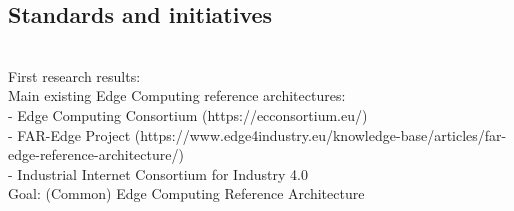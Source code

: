 \subsection{Standards and initiatives}
\\
First research results:\\
Main existing Edge Computing reference architectures:\\
- Edge Computing Consortium (https://ecconsortium.eu/)\\ 
- FAR-Edge Project (https://www.edge4industry.eu/knowledge-base/articles/far-edge-reference-architecture/)\\
- Industrial Internet Consortium for Industry 4.0\\

Goal: (Common) Edge Computing Reference Architecture